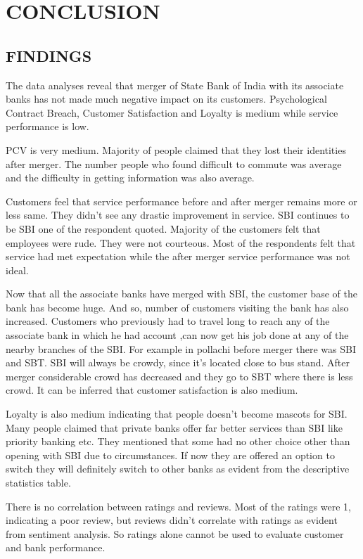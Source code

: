 \documentclass[a4paper, 12pt]{extarticle}
\begin{document}
{\section{CONCLUSION}
\subsection{FINDINGS}
The data analyses reveal that merger of State Bank of India with its associate banks has not made much negative impact on its customers. Psychological Contract Breach, Customer Satisfaction and Loyalty is medium while service performance is low.

PCV is very medium. Majority of people claimed that they lost their identities after merger. The number people who found difficult to commute was average and the difficulty in getting information was also average.

Customers feel that service performance before and after merger remains more or less same. They didn't see any drastic improvement in service. SBI continues to be SBI one of the respondent quoted. Majority of the customers felt that employees were rude. They were not courteous. Most of the respondents felt that service had met expectation while the after merger service performance was not ideal.

Now that all the associate banks have merged with SBI, the customer base of the bank has become huge. And so, number of customers visiting the bank has also increased. Customers who previously had to travel long to reach any of the associate bank in which he had account ,can now get his job done at any of the nearby branches of the SBI. For example in pollachi before merger there was SBI and SBT. SBI will always be crowdy, since it's located close to bus stand. After merger considerable crowd has decreased and they go to SBT where there is less crowd. It can be inferred that customer satisfaction is also medium.

Loyalty is also medium indicating that people doesn't become mascots for SBI. Many people claimed that private banks offer far better services than SBI like priority banking etc. They mentioned that some had no other choice other than opening with SBI due to circumstances. If now they are offered an option to switch they will definitely switch to other banks as evident from the descriptive statistics table.

There is no correlation between ratings and reviews. Most of the ratings were 1, indicating a poor review, but reviews didn't correlate with ratings as evident from sentiment analysis. So ratings alone cannot be used to evaluate customer and bank performance.

}
\end{document}
